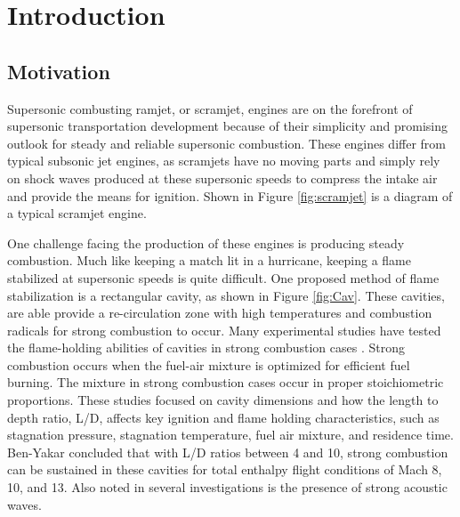 
\chapter{Introduction} %

\label{Chapter2} %


\section{Motivation}

Supersonic combusting ramjet, or scramjet, engines are on the forefront of supersonic transportation development because of their simplicity and promising outlook for steady and reliable supersonic combustion. These engines differ from typical subsonic jet engines, as scramjets have no moving parts and simply rely on shock waves produced at these supersonic speeds to compress the intake air and provide the means for ignition. Shown in Figure \ref{fig:scramjet} is a diagram of a typical scramjet engine.

One challenge facing the production of these engines is producing steady combustion. Much like keeping a match lit in a hurricane, keeping a flame stabilized at supersonic speeds is quite difficult. One proposed method of flame stabilization is a rectangular cavity, as shown in Figure \ref{fig:Cav}. These cavities, are able provide a re-circulation zone with high temperatures and combustion radicals for strong combustion to occur. Many experimental studies have tested the flame-holding abilities of cavities in strong combustion cases \cite{ben2000experimental,ben2001cavity,do2009plasma,yilmaz2013investigation}. Strong combustion occurs when the fuel-air mixture is optimized for efficient fuel burning. The mixture in strong combustion cases occur in proper stoichiometric proportions. These studies focused on cavity dimensions and how the length to depth ratio, L/D, affects key ignition and flame holding characteristics, such as stagnation pressure, stagnation temperature, fuel air mixture, and residence time. Ben-Yakar concluded that with L/D ratios between 4 and 10, strong combustion can be sustained in these cavities for total enthalpy flight conditions of Mach 8, 10, and 13\cite{ben2001cavity}. Also noted in several investigations is the presence of strong acoustic waves\cite{unalmis2004cavity,heller1996letter,williams2007supersonic, mcgregor1970drag,luo2011drag, sato1999advanced}. 

